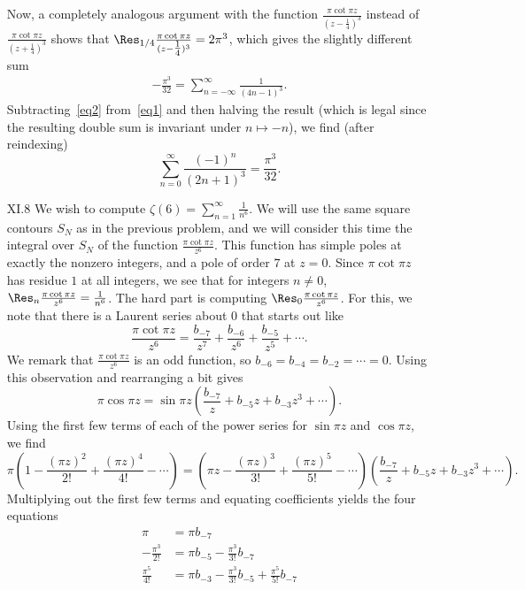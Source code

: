 \documentclass[11pt]{book}
\theoremstyle{definition}
\begin{document}
\begin{enumerate}
      Now, a completely analogous argument with the function $\frac{\pi \cot \pi z}{(z-\tfrac 1 4)^3}$ instead of $\frac{\pi \cot \pi z}{(z+\tfrac 1 4)^3}$ shows that $\Res_{1/4} \frac{\pi \cot \pi z}{(z-\tfrac 1 4)^3} = 2\pi^3$, which gives the slightly different sum
    \begin{align} -\frac{\pi^3}{32} = \sum_{n=-\infty}^\infty \frac{1}{(4n-1)^3} .  \label{eq2} \end{align}
      Subtracting~\eqref{eq2} from~\eqref{eq1} and then halving the result (which is legal since the resulting double sum is invariant under $n\mapsto -n$), we find (after reindexing)
      \[ \sum_{n=0}^\infty \frac{(-1)^n}{(2n+1)^3} = \frac{\pi^3}{32}. \] 

    \item[XI.8]  We wish to compute $\zeta(6) = \sum_{n=1}^\infty \frac{1}{n^6}$.  We will use the same square contours $S_N$ as in the previous problem, and we will consider this time the integral over $S_N$ of the function $\frac{\pi \cot \pi z}{z^6}$.  This function has simple poles at exactly the nonzero integers, and a pole of order $7$ at $z=0$.  Since $\pi \cot \pi z$ has residue $1$ at all integers, we see that for integers $n\neq 0$, $\Res_n \frac{\pi \cot \pi z}{z^6} = \frac{1}{n^6}$.   The hard part is computing $\Res_0 \frac{\pi \cot \pi z}{z^6}$.  For this, we note that there is a Laurent series about $0$ that starts out like 
      \[ \frac{\pi \cot \pi z}{z^6} = \frac{b_{-7}}{z^7} + \frac{b_{-6}}{z^6}  + \frac{b_{-5}}{z^5} + \cdots. \]  We remark that $\frac{\pi \cot \pi z}{z^6}$ is an odd function, so $b_{-6} = b_{-4} = b_{-2} = \cdots = 0$.  Using this observation and rearranging a bit gives
      \[ \pi \cos \pi z = \sin \pi z \left( \frac{b_{-7}}{z} + b_{-5} z + b_{-3}z^3  + \cdots \right). \]  Using the first few terms of each of the power series for $\sin \pi z$ and $\cos \pi z$, we find 
      \[ \pi \left( 1 - \frac{(\pi z)^2}{2!} + \frac{(\pi z)^4}{4!} - \cdots \right)  = \left( \pi z - \frac{(\pi z)^3}{3!} + \frac{(\pi z)^5}{5!} - \cdots \right) \left( \frac{b_{-7}}{z} +b_{-5} z + b_{-3}z^3 + \cdots \right). \]   
      Multiplying out the first few terms and equating coefficients yields the four equations
      \begin{align*}
        \pi &= \pi b_{-7} \\ 
        -\frac{\pi^3}{2!} &= \pi b_{-5} - \frac{\pi^3}{3!} b_{-7} \\  
        \frac{\pi^5}{4!} &= \pi b_{-3} - \frac{\pi^3}{3!} b_{-5} + \frac{\pi^5}{5!} b_{-7} \\

\end{align*}
\end{enumerate}
\end{document}
